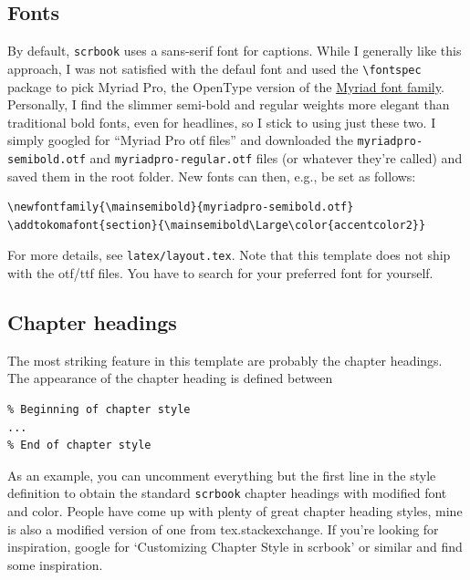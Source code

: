 \subsection{Fonts}
By default, \verb|scrbook| uses a sans-serif font for captions. While I generally like this approach, I was not satisfied with the defaul font and used the \verb|\fontspec| package to pick Myriad Pro, the OpenType version of the \href{https://en.wikipedia.org/wiki/Myriad_(typeface)}{Myriad font family}.
Personally, I find the slimmer semi-bold and regular weights more elegant than traditional bold fonts, even for headlines, so I stick to using just these two. I simply googled for ``Myriad Pro otf files'' and downloaded the \verb|myriadpro-semibold.otf| and \verb|myriadpro-regular.otf| files (or whatever they're called) and saved them in the root folder. New fonts can then, e.g., be set as follows:
\begin{lstlisting}
\newfontfamily{\mainsemibold}{myriadpro-semibold.otf}
\addtokomafont{section}{\mainsemibold\Large\color{accentcolor2}}
\end{lstlisting}
For more details, see \verb|latex/layout.tex|.
Note that this template does not ship with the otf/ttf files. You have to search for your preferred font for yourself.


\subsection{Chapter headings}
The most striking feature in this template are probably the chapter headings.
The appearance of the chapter heading is defined between
\begin{lstlisting}
% Beginning of chapter style
...
% End of chapter style
\end{lstlisting}
As an example, you can uncomment everything but the first line in the style definition to obtain the standard \verb|scrbook| chapter headings with modified font and color. 
People have come up with plenty of great chapter heading styles, mine is also a modified version of one from tex.stackexchange. If you’re looking for inspiration, google for `Customizing Chapter Style in scrbook' or similar and find some inspiration.

